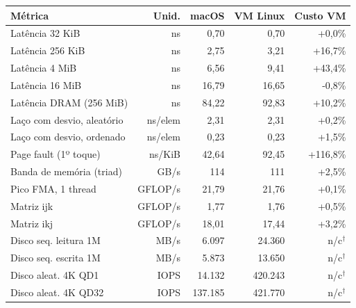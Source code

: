 \begin{tabular}{lrrrr}
\hline
\textbf{Métrica} & \textbf{Unid.} & \textbf{macOS} & \textbf{VM Linux} & \textbf{Custo VM} \\ \hline
Latência 32 KiB & ns & 0{,}70 & 0{,}70 & +0{,}0\% \\
Latência 256 KiB & ns & 2{,}75 & 3{,}21 & +16{,}7\% \\
Latência 4 MiB & ns & 6{,}56 & 9{,}41 & +43{,}4\% \\
Latência 16 MiB & ns & 16{,}79 & 16{,}65 & -0{,}8\% \\
Latência DRAM (256 MiB) & ns & 84{,}22 & 92{,}83 & +10{,}2\% \\
Laço com desvio, aleatório & ns/elem & 2{,}31 & 2{,}31 & +0{,}2\% \\
Laço com desvio, ordenado & ns/elem & 0{,}23 & 0{,}23 & +1{,}5\% \\
Page fault (1º toque) & ns/KiB & 42{,}64 & 92{,}45 & +116{,}8\% \\
Banda de memória (triad) & GB/s & 114 & 111 & +2{,}5\% \\
Pico FMA, 1 thread & GFLOP/s & 21{,}79 & 21{,}76 & +0{,}1\% \\
Matriz ijk & GFLOP/s & 1{,}77 & 1{,}76 & +0{,}5\% \\
Matriz ikj & GFLOP/s & 18{,}01 & 17{,}44 & +3{,}2\% \\
Disco seq. leitura 1M & MB/s & 6.097 & 24.360 & n/c$^\dagger$ \\
Disco seq. escrita 1M & MB/s & 5.873 & 13.650 & n/c$^\dagger$ \\
Disco aleat. 4K QD1 & IOPS & 14.132 & 420.243 & n/c$^\dagger$ \\
Disco aleat. 4K QD32 & IOPS & 137.185 & 421.770 & n/c$^\dagger$ \\
\hline
\end{tabular}

